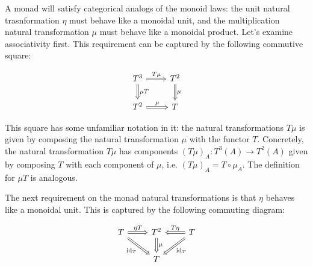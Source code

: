 A monad will satisfy categorical analogs of the monoid laws: the unit natural trasnformation $\eta$ 
must behave like a monoidal unit, and the multiplication natural transformation $\mu$ 
must behave like a monoidal product.
Let's examine associativity first.
This requirement can be captured by the following commutive square:

\begin{equation}
\begin{tikzcd}
    T^3 \arrow[r, "T\mu ", Rightarrow] \arrow[d, "\mu T", Rightarrow] & T^2 \arrow[d, "\mu", Rightarrow] \\
    T^2 \arrow[r, "\mu", Rightarrow]                                  & T                               
    \end{tikzcd} 
\label{eq:monad-assoc}
\end{equation}

This square has some unfamiliar notation in it: the 
natural transformations $T \mu$ is given by composing 
the natural transformation $\mu$ with the functor $T$. Concretely,
the natural transformation $T \mu$ has components 
$(T \mu)_A : T^3(A) \to T^2(A)$ given by 
composing $T$ with each component of $\mu$, 
i.e. $(T \mu)_A = T \circ \mu_A$. 
The definition for $\mu T$ is analogous.

The next requirement on the monad natural transformations is that $\eta$ 
behaves like a monoidal unit. This is captured by the following commuting diagram:

\begin{equation}
\begin{tikzcd}
    T \arrow[rd, "\text{id}_T"', Rightarrow] \arrow[r, "\eta T", Rightarrow] & T^2 \arrow[d, "\mu", Rightarrow] & T \arrow[ld, "\text{id}_T", Rightarrow] \arrow[l, "T \eta "', Rightarrow] \\
                                                                             & T                                &                                                                          
    \end{tikzcd}
    \label{eq:monad-unit}
\end{equation}


